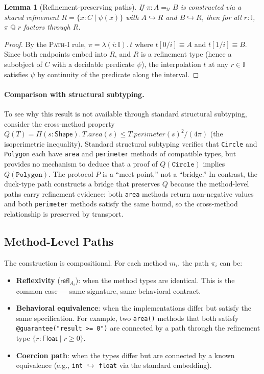 \documentclass[acmsmall,nonacm,screen]{acmart}
\newtheorem{lemma}[theorem]{Lemma}
\newcommand{\syntype}[1]{\ensuremath{\mathsf{#1}}}
\newcommand{\pitype}[3]{\Pi(#1 : #2).\,#3}
\newcommand{\pathtype}[3]{#2 =_{#1} #3}
\newcommand{\reftype}[3]{\{#1 : #2 \mid #3\}}
\newcommand{\interval}{\mathbb{I}}
\newcommand{\universe}{\mathcal{U}}
\newcommand{\refl}[1]{\syntype{refl}_{#1}}
\begin{document}
\begin{lemma}[Refinement-preserving paths]\label{lem:refine-path}
If $\pi : \pathtype{\universe}{A}{B}$ is constructed via a shared
refinement $R = \reftype{x}{C}{\psi(x)}$ with
$A \hookrightarrow R$ and $B \hookrightarrow R$, then for all
$r : \interval$, $\pi\;@\;r$ factors through $R$.
\end{lemma}

\begin{proof}
By the \textsc{Path-I} rule, $\pi = \lambda(i:\interval).\,t$ where
$t[0/i] \equiv A$ and $t[1/i] \equiv B$.  Since both endpoints embed
into $R$, and $R$ is a refinement type (hence a subobject of $C$ with
a decidable predicate $\psi$), the interpolation $t$ at any
$r \in \interval$ satisfies $\psi$ by continuity of the predicate
along the interval.
\end{proof}

\paragraph{Comparison with structural subtyping.}
To see why this result is not available through standard structural
subtyping, consider the cross-method property
$Q(T) = \pitype{s}{\syntype{Shape}}{T.\mathit{area}(s) \le
  T.\mathit{perimeter}(s)^2 / (4\pi)}$ (the isoperimetric
inequality).  Standard structural subtyping verifies that
\texttt{Circle} and \texttt{Polygon} each have \texttt{area} and
\texttt{perimeter} methods of compatible types, but provides no
mechanism to deduce that a proof of $Q(\texttt{Circle})$ implies
$Q(\texttt{Polygon})$.  The protocol $P$ is a ``meet point,'' not
a ``bridge.''  In contrast, the duck-type path constructs a bridge
that preserves $Q$ because the method-level paths carry refinement
evidence: both \texttt{area} methods return non-negative values and
both \texttt{perimeter} methods satisfy the same bound, so the
cross-method relationship is preserved by transport.

\subsection{Method-Level Paths}

The construction is compositional.  For each method $m_i$, the path
$\pi_i$ can be:

\begin{itemize}
\item \textbf{Reflexivity} ($\refl{A_i}$): when the method types are
  identical.  This is the common case --- same signature, same behavioral
  contract.

\item \textbf{Behavioral equivalence}: when the implementations differ
  but satisfy the same specification.  For example, two
  \texttt{area()} methods that both satisfy \texttt{@guarantee("result
    >= 0")} are connected by a path through the refinement type
  $\reftype{r}{\syntype{Float}}{r \ge 0}$.

\item \textbf{Coercion path}: when the types differ but are connected
  by a known equivalence (e.g., \texttt{int} $\hookrightarrow$
  \texttt{float} via the standard embedding).
\end{itemize}
\end{document}
